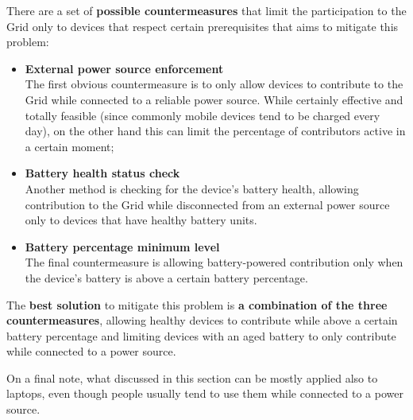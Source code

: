 There are a set of \textbf{possible countermeasures} that limit the participation to the Grid only to devices that respect certain prerequisites that aims to mitigate this problem:
\begin{itemize}
    \item \textbf{External power source enforcement}\\
    The first obvious countermeasure is to only allow devices to contribute to the Grid while connected to a reliable power source. While certainly effective and totally feasible (since commonly mobile devices tend to be charged every day), on the other hand this can limit the percentage of contributors active in a certain moment;
    \item \textbf{Battery health status check}\\
    Another method is checking for the device's battery health, allowing contribution to the Grid while disconnected from an external power source only to devices that have healthy battery units.
    \item \textbf{Battery percentage minimum level}\\
    The final countermeasure is allowing battery-powered contribution only when the device's battery is above a certain battery percentage.
\end{itemize}
The \textbf{best solution} to mitigate this problem is \textbf{a combination of the three countermeasures}, allowing healthy devices to contribute while above a certain battery percentage and limiting devices with an aged battery to only contribute while connected to a power source.

On a final note, what discussed in this section can be mostly applied also to laptops, even though people usually tend to use them while connected to a power source.

